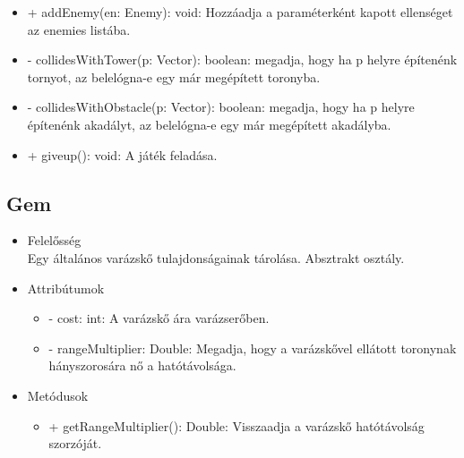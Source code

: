 \begin{itemize}
\begin{itemize}
		\item + addEnemy(en: Enemy): void: Hozzáadja a paraméterként kapott ellenséget az enemies listába.
		\item - collidesWithTower(p: Vector): boolean: megadja, hogy ha p helyre építenénk tornyot, az belelógna-e egy már megépített toronyba.
		\item - collidesWithObstacle(p: Vector): boolean: megadja, hogy ha p helyre építenénk akadályt, az belelógna-e egy már megépített akadályba.
		\item + giveup(): void: A játék feladása.
	\end{itemize}
\end{itemize}

\subsection{Gem}
\begin{itemize}
\item Felelősség\\
Egy általános varázskő tulajdonságainak tárolása. Absztrakt osztály.
\item Attribútumok
	\begin{itemize}
		\item - cost: int: A varázskő ára varázserőben.
		\item - rangeMultiplier: Double: Megadja, hogy a varázskővel ellátott toronynak hányszorosára nő a hatótávolsága.
	\end{itemize}
\item Metódusok
	\begin{itemize}
		\item + getRangeMultiplier(): Double: Visszaadja a varázskő hatótávolság szorzóját.
	\end{itemize}
\end{itemize}

